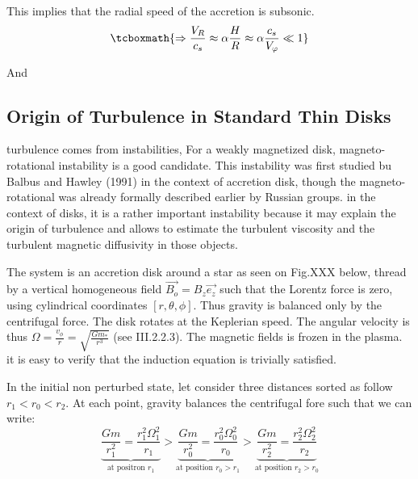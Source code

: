 \documentclass[10pt,a4paper,english]{article}
\begin{document}
This implies that the radial speed of the accretion is subsonic.
\begin{equation}
    \tcboxmath{
        \Rightarrow \frac{V_R}{c_s} \approx \alpha \frac{H}{R} \approx \alpha \frac{c_s}{V_\varphi} \ll 1
    }
\end{equation}

And %

\subsection{Origin of Turbulence in Standard Thin Disks}

turbulence comes from instabilities, For a weakly magnetized disk,
magneto-rotational instability is a good candidate. This instability was first
studied bu Balbus and Hawley  (1991) in the context of accretion disk, though
the magneto-rotational was already formally described earlier by Russian
groups. in the context of disks, it is a rather important instability because
it may explain the origin of turbulence and allows to estimate the turbulent
viscosity  and the turbulent magnetic diffusivity in those objects.


The system is an accretion disk around a star as seen on Fig.XXX below, thread
by a vertical homogeneous field $\vec{B_o} = B_z\vec{e_z}$ such that the
Lorentz force is zero, using cylindrical coordinates $[r,\theta,\phi]$. Thus
gravity is balanced only by the centrifugal force. The disk rotates  at the
Keplerian speed. The angular velocity is thus $\Omega = \frac{v_{\phi}}{r} =
\sqrt{\frac{Gm_*}{r^3}}$ (see III.2.2.3). The magnetic fields is frozen in
the plasma. it is easy to verify that the induction equation is trivially
satisfied.


In the initial non perturbed state, let consider three distances sorted as
follow $r_1 < r_0 < r_2 $. At each point, gravity balances the centrifugal fore
such that we can write:
\begin{equation}
    \underbrace{\frac{Gm}{r_1^2} = \frac{r_1^2\Omega_1^2}{r_1}}_{\text{at positron  } r_1} >
    \underbrace{\frac{Gm}{r_0^2} = \frac{r_0^2\Omega_0^2}{r_0}}_{\text{at position }r_0 > r_1}	>
    \underbrace{\frac{Gm}{r_2^2} = \frac{r_2^2\Omega_2^2}{r_2}}_{\text{at position }r_2 > r_0}
\end{equation}
\end{document}
